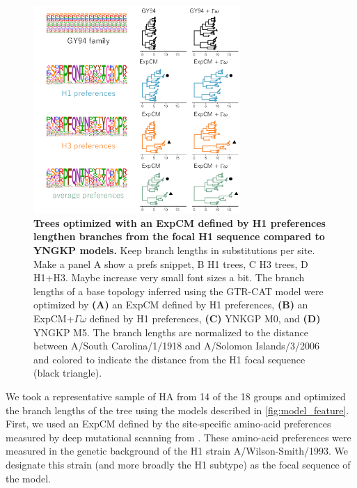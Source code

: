 \documentclass[11pt]{article}
\newcommand\jdbcomment[1]{{\color{red}#1}}
\begin{document}
\begin{figure}[H]
\centerline{\includegraphics[width=0.70\textwidth]{figures/empirical_trees_2}}
\caption{\label{fig:empirical_trees2}
\textbf{Trees optimized with an ExpCM defined by H1 preferences lengthen branches from the focal H1 sequence compared to YNGKP models.} 
\jdbcomment{Keep branch lengths in substitutions per site. Make a panel A show a prefs snippet, B H1 trees, C H3 trees, D H1+H3. Maybe increase very small font sizes a bit.}
The branch lengths of a base topology inferred using the GTR-CAT model were optimized by \textbf{(A)} an ExpCM defined by H1 preferences, \textbf{(B)} an ExpCM+$\Gamma\omega$ defined by H1 preferences, \textbf{(C)} YNKGP M0, and \textbf{(D)} YNGKP M5.
The branch lengths are normalized to the distance between A/South Carolina/1/1918 and A/Solomon Islands/3/2006 and colored to indicate the distance from the H1 focal sequence (black triangle).
}
\end{figure}

We took a representative sample of HA from 14 of the 18 groups and optimized the branch lengths of the tree using the models described in \ref{fig:model_feature}. 
First, we used an ExpCM defined by the site-specific amino-acid preferences measured by deep mutational scanning from \cite{doud2016accurate}. 
These amino-acid preferences were measured in the genetic background of the H1 strain A/Wilson-Smith/1993. 
We designate this strain (and more broadly the H1 subtype) as the focal sequence of the model. 
\end{document}
